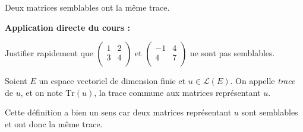 \documentclass[french,11pt,twoside]{VcCours}
\newenvironment{ApplicationDirecte}{\textbf{Application directe du cours :}

}{}
\begin{document}
\begin{Demonstration}{} 

\vspace{7cm}
\end{Demonstration}

\begin{Corollaire}{} Deux matrices semblables ont la même trace.
\end{Corollaire}

\begin{Demonstration}{} 
\vspace{3cm}
\end{Demonstration}


\begin{ApplicationDirecte} Justifier rapidement que $\begin{pmatrix}
1 & 2 \\
3 & 4 \\
\end{pmatrix}$ et $\begin{pmatrix}
-1 & 4 \\
4 & 7 \\
\end{pmatrix}$ ne sont pas semblables.
\end{ApplicationDirecte}



\begin{TheoremeDefinition}{} Soient $E$ un espace vectoriel de dimension finie et $u \in \mathcal{L}(E)$. On appelle \emph{trace} de $u$, et on note $\textrm{Tr}(u)$, la trace commune aux matrices représentant $u$.
\end{TheoremeDefinition}

\begin{Demonstration}{} Cette définition a bien un sens car deux matrices représentant $u$ sont semblables et ont donc la même trace.
\end{Demonstration}
\end{document}
